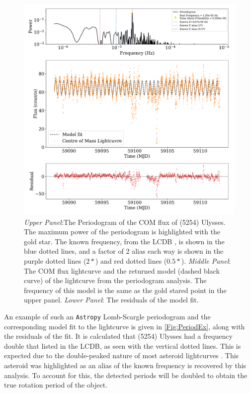 \documentclass{UCreport}
\begin{document}
\begin{figure}[!t]
  \centering
  \includegraphics[width=\textwidth]{./Figures/PeriodogramUlyssesResid.pdf}
  \caption[Periodogram example]{\textit{Upper Panel}:The Periodogram of the COM flux of (5254) Ulysses.
    The maximum power of the periodogram is highlighted with the gold star.
    The known frequency, from the LCDB \citep{Warner2009}, is shown in the blue dotted lines, and a factor of 2 alias each way is shown in the purple dotted lines ($2*$) and red dotted lines ($0.5*$).
    \textit{Middle Panel}: The COM flux lightcurve and the returned model (dashed black curve) of the lightcurve from the periodogram analysis.
    The frequency of this model is the same as the gold stared point in the upper panel.
    \textit{Lower Panel}: The residuals of the model fit.
  }
  \label{Fig:PeriodEx}
\end{figure}


An example of such an \texttt{Astropy} Lomb-Scargle periodogram and the corresponding model fit to the lightcurve is given in \autoref{Fig:PeriodEx}, along with the residuals of the fit.
It is calculated that (5254) Ulysses had a frequency double that listed in the LCDB, as seen with the vertical dotted lines.
This is expected due to the double-peaked nature of most asteroid lightcurves \citep{McNeill2023}.
This asteroid was highlighted as an alias of the known frequency is recovered by this analysis.
To account for this, the detected periods will be doubled to obtain the true rotation period of the object.
\end{document}
